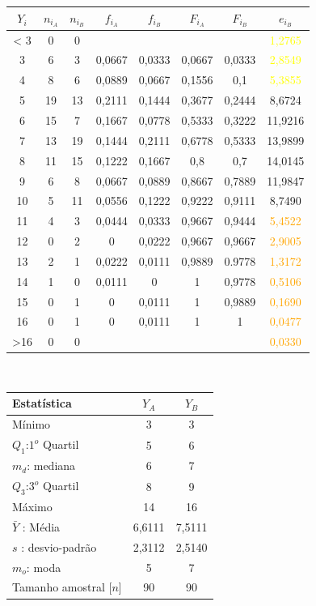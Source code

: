 \begin{minipage}{0pt}
\begin{tabular}{ |c|c|c|c|c|c|c|c| }
\hline
$Y_i$ & $n_{i_A}$ & $n_{i_B}$ & $f_{i_A}$ & $f_{i_B}$ & $F_{i_A}$ & $F_{i_B}$ & $e_{i_B}$ \\
\hline
< 3 & 0 & 0 & & & & & \textcolor{yellow}{1,2765} \\
\hline
3 & 6 & 3 & 0,0667 & 0,0333 & 0,0667 & 0,0333 & \textcolor{yellow}{2,8549} \\
\hline
4 & 8 & 6 & 0,0889 & 0,0667 & 0,1556 & 0,1 & \textcolor{yellow}{5,3855} \\
\hline
5 & 19 & 13 & 0,2111 & 0,1444 & 0,3677 & 0,2444 & 8,6724 \\
\hline
6 & 15 & 7 & 0,1667 & 0,0778 & 0,5333 & 0,3222 & 11,9216 \\
\hline
7 & 13 & 19 & 0,1444 & 0,2111 & 0,6778 & 0,5333 & 13,9899 \\
\hline
8 & 11 & 15 & 0,1222 & 0,1667 & 0,8 & 0,7 & 14,0145 \\
\hline
9 & 6 & 8 & 0,0667 & 0,0889 & 0,8667 & 0,7889 & 11,9847 \\
\hline
10 & 5 & 11 & 0,0556 & 0,1222 & 0,9222 & 0,9111 & 8,7490 \\
\hline
11 & 4 & 3 & 0,0444 & 0,0333 & 0,9667 & 0,9444 & \textcolor{orange}{5,4522}\\
\hline
12 & 0 & 2 & 0 & 0,0222 & 0,9667 & 0,9667 & \textcolor{orange}{2,9005} \\
\hline
13 & 2 & 1 & 0,0222 & 0,0111 & 0,9889 & 0.9778 & \textcolor{orange}{1,3172} \\
\hline
14 & 1 & 0 & 0,0111 & 0 & 1 & 0,9778 & \textcolor{orange}{0,5106} \\
\hline
15 & 0 & 1 & 0 & 0,0111 & 1 & 0,9889 & \textcolor{orange}{0,1690} \\
\hline
16 & 0 & 1 & 0 & 0,0111 & 1 & 1 & \textcolor{orange}{0,0477} \\
\hline
>16 & 0 & 0 & & & & & \textcolor{orange}{0,0330} \\
\hline
\end{tabular}
\end{minipage}
\\
\begin{minipage}[!b]{0.40\linewidth}
\begin{tabular}{ l c c }
\hline
Estatística & $Y_A$ & $Y_B$ \\
\hline
Mínimo & 3 & 3 \\
$Q_1$:$1^o$ Quartil & 5 & 6 \\
$m_d$: mediana & 6 & 7 \\
$Q_3$:$3^o$ Quartil & 8 & 9 \\
Máximo & 14 & 16 \\
\hline
$\bar{Y}$ : Média & 6,6111 & 7,5111 \\
$s$ : desvio-padrão & 2,3112 & 2,5140\\
$m_o$: moda & 5 & 7\\
\hline
Tamanho amostral [$n$] & 90 & 90 \\
\hline
\end{tabular}
\label{Tab:Resulatdos}
\end{minipage}
